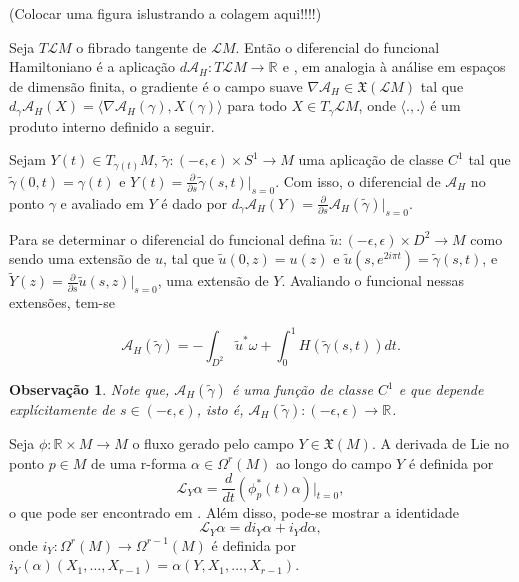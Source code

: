 \documentclass[12pt]{book}
\newtheorem{observacao}[teorema]{Observação}
\newcommand{\campossuaves}[1]{\mathfrak{X}(#1)}
\newcommand{\derivada}[2]{\frac{d #1}{d #2}}
\newcommand{\derivadaparcial}[2]{\frac{\partial #1}{\partial #2}}
\newcommand{\espacotangenteponto}[2]{T_{#1}#2}
\newcommand{\funcionalH}{\mathcal{A}_{H}}
\newcommand{\funcionalHponto}[1]{\mathcal{A}_{H}(#1)}
\newcommand{\gradientefuncional}{\nabla \funcionalH}
\newcommand{\liederivada}[1]{\mathcal{L}_{#1}}
\newcommand{\produtointerno}[2]{\langle #1, #2 \rangle}
\newcommand{\retacartesianovariedade}{\real{} \times M}
\newcommand{\real}[1]{\mathbb{R}^{#1}}
\newcommand{\reta}{\real{}}
\newcommand{\lacocontrateis}{\mathcal{L}M}
\newcommand{\vermelho}[1]{{\color{red}#1}}
\begin{document}
	\vermelho{(Colocar uma figura islustrando a colagem aqui!!!!)}
	
	Seja $T\lacocontrateis$ o fibrado tangente de $\lacocontrateis$. Então o diferencial do funcional Hamiltoniano é a aplicação $d\funcionalH: T\lacocontrateis \to \real{}$ e , em analogia à análise em espaços de dimensão finita, o gradiente é o campo suave $\gradientefuncional\in \campossuaves{\lacocontrateis}$ tal que $d_{\gamma}\funcionalH(X) = \produtointerno{\gradientefuncional(\gamma)}{X(\gamma)}$ para todo $X\in \espacotangenteponto{\gamma}{\lacocontrateis}$, onde $\produtointerno{.}{.}$ é um produto interno definido a seguir.
	
	Sejam $Y(t) \in \espacotangenteponto{\gamma(t)}{M}$, $\tilde{\gamma}:(-\epsilon, \epsilon)\times S^{1} \to M$  uma aplicação de classe $C^{1}$ tal que $\tilde{\gamma}(0,t) = \gamma(t)$ e $Y(t) = \derivadaparcial{}{s}\tilde{\gamma}(s,t)|_{s=0}$. Com isso, o diferencial de $\funcionalH$ no ponto $\gamma$ e avaliado em $Y$ é dado por $d_{\gamma}\funcionalH(Y) = \derivadaparcial{}{s}\funcionalH(\tilde{\gamma})|_{s=0}$.
	
	Para se determinar o diferencial do funcional defina $\tilde{u}:(-\epsilon, \epsilon)\times D^{2} \to M$ como sendo uma extensão de $u$, tal que $\tilde{u}(0,z) = u(z)$ e $\tilde{u}(s,e^{2i\pi t}) = \tilde{\gamma}(s,t)$, e $\tilde{Y}(z) = \derivadaparcial{}{s}\tilde{u}(s,z)|_{s=0}$, uma extensão de $Y$. Avaliando o funcional nessas extensões, tem-se
	
	$$
	\funcionalHponto{\tilde{\gamma}} = -\int_{D^{2}}\tilde{u}^{*}\omega + \int_{0}^{1}H(\tilde{\gamma}(s,t))dt.
	$$
	
	\begin{observacao}
		Note que, $	\funcionalHponto{\tilde{\gamma}}$ é uma função de classe $C^{1}$ e que depende explícitamente de $s\in (-\epsilon, \epsilon)$, isto é, $	\funcionalHponto{\tilde{\gamma}}:(-\epsilon,\epsilon)\to \reta$. 
	\end{observacao}
	
	Seja $\phi:\retacartesianovariedade\to M$ o fluxo gerado pelo campo $Y\in \campossuaves{M}$. A derivada de Lie no ponto $p\in M $ de uma r-forma $\alpha \in \Omega^{r}(M)$ ao longo do campo $Y$ é definida por 
	$$
	\liederivada{Y}\alpha = \derivada{}{t}(\phi^{*}_{p}(t)\alpha)|_{t=0},
	$$ 
	o que pode ser encontrado em \cite{nakahara}. Além disso, pode-se mostrar a identidade 
	$$
	\liederivada{Y}\alpha= di_{Y}\alpha+i_{Y}d\alpha,
	$$
	onde $i_{Y}:\Omega^{r}(M)\to \Omega^{r-1}(M)$ é definida por $i_{Y}(\alpha)(X_{1}, \dots, X_{r-1}) = \alpha(Y, X_{1}, \dots, X_{r-1})$.
	
\end{document}
